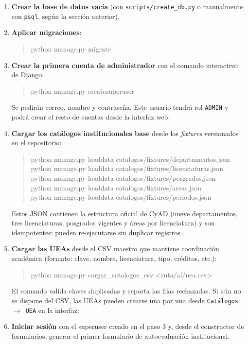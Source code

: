 \documentclass{computacion}
\begin{document}
\begin{enumerate}
    \item \textbf{Crear la base de datos vacía} (con \texttt{scripts/create\_db.py} o manualmente con \texttt{psql}, según la sección anterior).
    \item \textbf{Aplicar migraciones}:
    \begin{quote}\ttfamily python manage.py migrate\end{quote}
    \item \textbf{Crear la primera cuenta de administrador} con el comando interactivo de Django:
    \begin{quote}\ttfamily python manage.py createsuperuser\end{quote}
    Se pedirán correo, nombre y contraseña. Este usuario tendrá rol \texttt{ADMIN} y podrá crear el resto de cuentas desde la interfaz web.
    \item \textbf{Cargar los catálogos institucionales base} desde los \emph{fixtures} versionados en el repositorio:
    \begin{quote}
    \ttfamily
    python manage.py loaddata catalogos/fixtures/departamentos.json \\
    python manage.py loaddata catalogos/fixtures/licenciaturas.json \\
    python manage.py loaddata catalogos/fixtures/posgrados.json \\
    python manage.py loaddata catalogos/fixtures/areas.json \\
    python manage.py loaddata catalogos/fixtures/periodos.json
    \end{quote}
    Estos JSON contienen la estructura oficial de CyAD (nueve departamentos, tres licenciaturas, posgrados vigentes y áreas por licenciatura) y son idempotentes: pueden re-ejecutarse sin duplicar registros.
    \item \textbf{Cargar las UEAs} desde el CSV maestro que mantiene coordinación académica (formato: clave, nombre, licenciatura, tipo, créditos, etc.):
    \begin{quote}\ttfamily python manage.py cargar\_catalogos\_csv <ruta/al/uea.csv>\end{quote}
    El comando valida claves duplicadas y reporta las filas rechazadas. Si aún no se dispone del CSV, las UEAs pueden crearse una por una desde \texttt{Catálogos $\to$ UEA} en la interfaz.
    \item \textbf{Iniciar sesión} con el superuser creado en el paso 3 y, desde el constructor de formularios, generar el primer formulario de autoevaluación institucional.
\end{enumerate}
\end{document}
